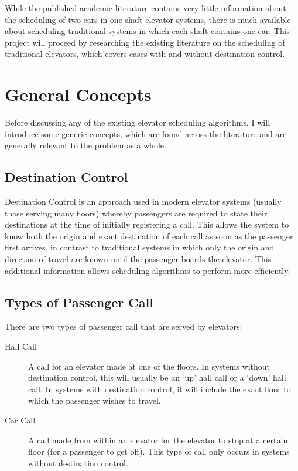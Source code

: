 \documentclass{UoYCSproject}
\begin{document}
While the published academic literature contains very little information about the scheduling of two-cars-in-one-shaft elevator systems, there is much available about scheduling traditional systems in which each shaft contains one car.  This project will proceed by researching the existing literature on the scheduling of traditional elevators, which covers cases with and without destination control.

\section{General Concepts}

Before discussing any of the existing elevator scheduling algorithms, I will introduce some generic concepts, which are found across the literature and are generally relevant to the problem as a whole.

\subsection{Destination Control}

Destination Control is an approach used in modern elevator systems (usually those serving many floors) whereby passengers are required to state their destinations at the time of initially registering a call.  This allows the system to know both the origin and exact destination of each call as soon as the passenger first arrives, in contrast to traditional systems in which only the origin and direction of travel are known until the passenger boards the elevator.  This additional information allows scheduling algorithms to perform more efficiently.  \citep{Koehler2002}

\subsection{Types of Passenger Call}

There are two types of passenger call that are served by elevators:  \citep{Gagov2001, Bao1994}

\begin{description}
	\item[Hall Call] A call for an elevator made at one of the floors.  In systems without destination control, this will usually be an `up' hall call or a `down' hall call.  In systems with destination control, it will include the exact floor to which the passenger wishes to travel.
	\item[Car Call] A call made from within an elevator for the elevator to stop at a certain floor (for a passenger to get off).  This type of call only occurs in systems without destination control.
\end{description}
\end{document}
